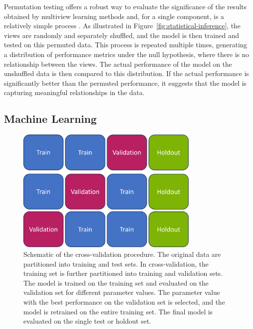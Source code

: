 Permutation testing offers a robust way to evaluate the significance of the results obtained by multiview learning methods and, for a single component, is a relatively simple process \citep{winkler2020permutation}.
As illustrated in Figure~\ref{fig:statistical-inference}, the views are randomly and separately shuffled, and the model is then trained and tested on this permuted data.
This process is repeated multiple times, generating a distribution of performance metrics under the null hypothesis, where there is no relationship between the views.
The actual performance of the model on the unshuffled data is then compared to this distribution.
If the actual performance is significantly better than the permuted performance, it suggests that the model is capturing meaningful relationships in the data.

\subsection{Machine Learning}

\begin{figure}
    \centering
    \includegraphics[width=0.8\textwidth]{figures/cross-validation.png}
    \caption{Schematic of the cross-validation procedure. The original data are partitioned into training and test sets. In cross-validation, the training set is further partitioned into training and validation sets. The model is trained on the training set and evaluated on the validation set for different parameter values. The parameter value with the best performance on the validation set is selected, and the model is retrained on the entire training set. The final model is evaluated on the single test or holdout set.}
    \label{fig:machine-learning}
\end{figure}

